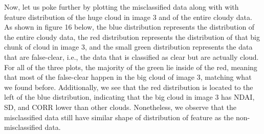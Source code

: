 \documentclass[jou]{apa}%
\begin{document}
\indent Now, let us poke further by plotting the misclassified data along with with feature distribution of the huge cloud in image 3 and of the entire cloudy data. As shown in figure 16 below, the blue distribution represents the distribution of the entire cloudy data, the red distribution represents the distribution of that big chunk of cloud in image 3, and the small green distribution represents the data that are false-clear, i.e., the data that is classified as clear but are actually cloud. For all of the three plots, the majority of the green lie inside of the red, meaning that most of the false-clear happen in the big cloud of image 3, matching what we found before. Additionally, we see that the red distribution is located to the left of the blue distribution, indicating that the big cloud in image 3 has NDAI, SD, and CORR lower than other clouds. Nonetheless, we observe that the misclassified data still have similar shape of distribution of feature as the non-misclassified data. 
\end{document}
